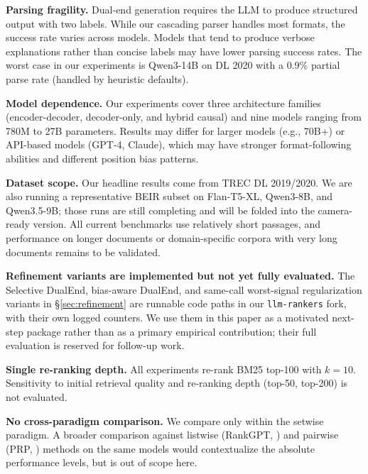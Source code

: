 \textbf{Parsing fragility.} Dual-end generation requires the LLM to produce structured output with two labels. While our cascading parser handles most formats, the success rate varies across models. Models that tend to produce verbose explanations rather than concise labels may have lower parsing success rates. The worst case in our experiments is Qwen3-14B on DL 2020 with a 0.9\% partial parse rate (handled by heuristic defaults).

\textbf{Model dependence.} Our experiments cover three architecture families (encoder-decoder, decoder-only, and hybrid causal) and nine models ranging from 780M to 27B parameters. Results may differ for larger models (e.g., 70B+) or API-based models (GPT-4, Claude), which may have stronger format-following abilities and different position bias patterns.

\textbf{Dataset scope.} Our headline results come from TREC DL 2019/2020. We are also running a representative BEIR subset on Flan-T5-XL, Qwen3-8B, and Qwen3.5-9B; those runs are still completing and will be folded into the camera-ready version. All current benchmarks use relatively short passages, and performance on longer documents or domain-specific corpora with very long documents remains to be validated.

\textbf{Refinement variants are implemented but not yet fully evaluated.} The Selective DualEnd, bias-aware DualEnd, and same-call worst-signal regularization variants in \S\ref{sec:refinement} are runnable code paths in our \texttt{llm-rankers} fork, with their own logged counters. We use them in this paper as a motivated next-step package rather than as a primary empirical contribution; their full evaluation is reserved for follow-up work.

\textbf{Single re-ranking depth.} All experiments re-rank BM25 top-100 with $k=10$. Sensitivity to initial retrieval quality and re-ranking depth (top-50, top-200) is not evaluated.

\textbf{No cross-paradigm comparison.} We compare only within the setwise paradigm. A broader comparison against listwise (RankGPT, \citealp{sun2023chatgpt}) and pairwise (PRP, \citealp{qin2024large}) methods on the same models would contextualize the absolute performance levels, but is out of scope here.
